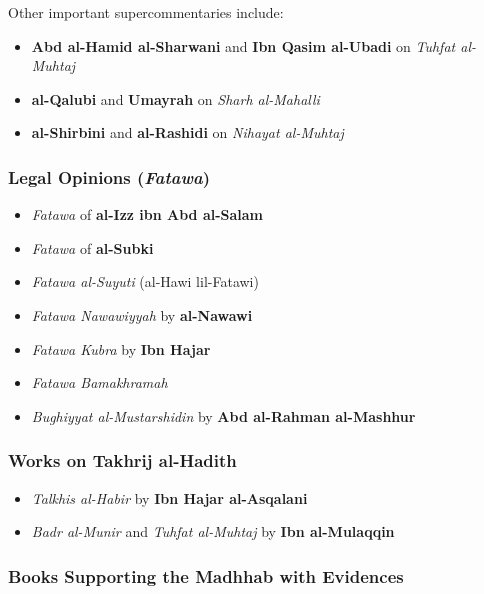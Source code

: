 \documentclass[
  a4paper,
  DIV=11,
  numbers=noendperiod]{scrartcl}
\providecommand{\tightlist}{%
  \setlength{\itemsep}{0pt}\setlength{\parskip}{0pt}}
\begin{document}
Other important supercommentaries include:

\begin{itemize}
\tightlist
\item
  \textbf{Abd al-Hamid al-Sharwani} and \textbf{Ibn Qasim al-Ubadi} on
  \emph{Tuhfat al-Muhtaj}
\item
  \textbf{al-Qalubi} and \textbf{Umayrah} on \emph{Sharh al-Mahalli}
\item
  \textbf{al-Shirbini} and \textbf{al-Rashidi} on \emph{Nihayat
  al-Muhtaj}
\end{itemize}

\subsubsection{\texorpdfstring{Legal Opinions
(\emph{Fatawa})}{Legal Opinions (Fatawa)}}\label{legal-opinions-fatawa}

\begin{itemize}
\tightlist
\item
  \emph{Fatawa} of \textbf{al-Izz ibn Abd al-Salam}
\item
  \emph{Fatawa} of \textbf{al-Subki}
\item
  \emph{Fatawa al-Suyuti} (al-Hawi lil-Fatawi)
\item
  \emph{Fatawa Nawawiyyah} by \textbf{al-Nawawi}
\item
  \emph{Fatawa Kubra} by \textbf{Ibn Hajar}
\item
  \emph{Fatawa Bamakhramah}
\item
  \emph{Bughiyyat al-Mustarshidin} by \textbf{Abd al-Rahman al-Mashhur}
\end{itemize}

\subsubsection{Works on Takhrij
al-Hadith}\label{works-on-takhrij-al-hadith}

\begin{itemize}
\tightlist
\item
  \emph{Talkhis al-Habir} by \textbf{Ibn Hajar al-Asqalani}
\item
  \emph{Badr al-Munir} and \emph{Tuhfat al-Muhtaj} by \textbf{Ibn
  al-Mulaqqin}
\end{itemize}

\subsubsection{Books Supporting the Madhhab with
Evidences}\label{books-supporting-the-madhhab-with-evidences}
\end{document}

